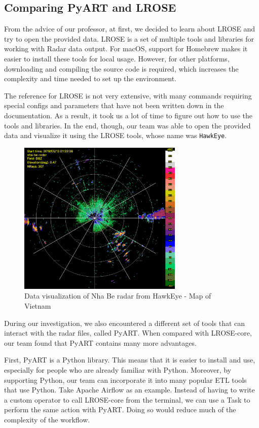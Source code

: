 \subsection{Comparing PyART and LROSE}
From the advice of our professor, at first, we decided to learn about LROSE and
try to open the provided data. LROSE is a set of multiple tools and libraries
for working with Radar data output. For macOS, support for Homebrew makes it
easier to install these tools for local usage. However, for other platforms,
downloading and compiling the source code is required, which increases the
complexity and time needed to set up the environment.

The reference for LROSE is not very extensive, with many commands requiring
special configs and parameters that have not been written down in the
documentation. As a result, it took us a lot of time to figure out how to use
the tools and libraries. In the end, though, our team was able to open the
provided data and visualize it using the LROSE tools, whose name was
\texttt{HawkEye}.

\begin{figure}[H]
  \centering
  \includegraphics[width=0.7\textwidth]{Images/3.1-201905130120.DBZ-hawkeye.png}
  \vspace{2em}
  \caption{Data visualization of Nha Be radar from HawkEye - Map of Vietnam}
  \label{fig:hawkeye}
\end{figure}

During our investigation, we also encountered a different set of tools that can
interact with the radar files, called PyART. When compared with LROSE-core, our
team found that PyART contains many more advantages.

First, PyART is a Python library. This means that it is easier to install and
use, especially for people who are already familiar with Python. Moreover, by
supporting Python, our team can incorporate it into many popular ETL tools that
use Python. Take Apache Airflow as an example. Instead of having to write a
custom operator to call LROSE-core from the terminal, we can use a Task to
perform the same action with PyART. Doing so would reduce much of the complexity
of the workflow.


